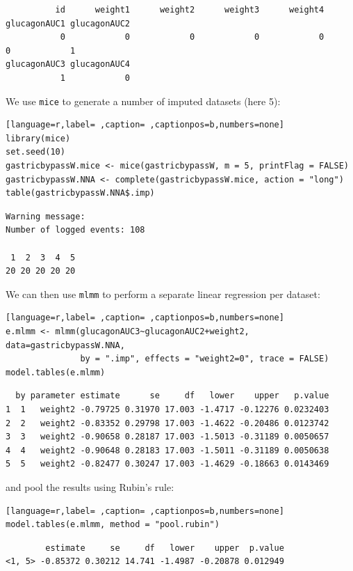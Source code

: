 \documentclass[12pt]{article}
\begin{document}
\begin{verbatim}
          id      weight1      weight2      weight3      weight4 glucagonAUC1 glucagonAUC2 
           0            0            0            0            0            0            1 
glucagonAUC3 glucagonAUC4 
           1            0
\end{verbatim}


We use \texttt{mice} to generate a number of imputed datasets (here 5):
\begin{lstlisting}[language=r,label= ,caption= ,captionpos=b,numbers=none]
library(mice)
set.seed(10)
gastricbypassW.mice <- mice(gastricbypassW, m = 5, printFlag = FALSE)
gastricbypassW.NNA <- complete(gastricbypassW.mice, action = "long")
table(gastricbypassW.NNA$.imp)
\end{lstlisting}

\begin{verbatim}
Warning message:
Number of logged events: 108

 1  2  3  4  5 
20 20 20 20 20
\end{verbatim}


We can then use \texttt{mlmm} to perform a separate linear regression per dataset:
\begin{lstlisting}[language=r,label= ,caption= ,captionpos=b,numbers=none]
e.mlmm <- mlmm(glucagonAUC3~glucagonAUC2+weight2, data=gastricbypassW.NNA,
               by = ".imp", effects = "weight2=0", trace = FALSE)
model.tables(e.mlmm)
\end{lstlisting}

\begin{verbatim}
  by parameter estimate      se     df   lower    upper   p.value
1  1   weight2 -0.79725 0.31970 17.003 -1.4717 -0.12276 0.0232403
2  2   weight2 -0.83352 0.29798 17.003 -1.4622 -0.20486 0.0123742
3  3   weight2 -0.90658 0.28187 17.003 -1.5013 -0.31189 0.0050657
4  4   weight2 -0.90648 0.28183 17.003 -1.5011 -0.31189 0.0050638
5  5   weight2 -0.82477 0.30247 17.003 -1.4629 -0.18663 0.0143469
\end{verbatim}


and pool the results using Rubin's rule:
\begin{lstlisting}[language=r,label= ,caption= ,captionpos=b,numbers=none]
model.tables(e.mlmm, method = "pool.rubin")
\end{lstlisting}

\begin{verbatim}
        estimate     se     df   lower    upper  p.value
<1, 5> -0.85372 0.30212 14.741 -1.4987 -0.20878 0.012949
\end{verbatim}
\end{document}
